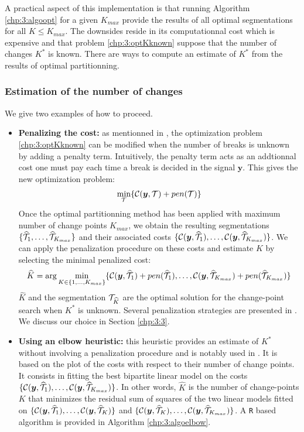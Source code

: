 A practical aspect of this implementation is that running Algorithm \ref{chp:3:algoopt} for a given $K_{max}$ provide the results of all optimal segmentations for all $K \leq K_{max}$. The downsides reside in its computationnal cost which is expensive and that problem \ref{chp:3:optKknown} suppose that the number of changes $K^*$ is known. There are ways to compute an estimate of $K^*$ from the results of optimal partitionning. 

\subsubsection{Estimation of the number of changes}

We give two examples of how to proceed.

\begin{itemize}
\item \textbf{Penalizing the cost:} as mentionned in \cite{truong2020}, the optimization problem \ref{chp:3:optKknown} can be modified when the number of breaks is unknown by adding a penalty term. Intuitively, the penalty term acts as an addtionnal cost one must pay each time a break is decided in the signal $\bm y$. This gives the new optimization problem: 
\begin{equation}\label{chp:3:optKnknown}
\min_{{\mathcal T}} \{ \mathcal{C}(\bm y,{\mathcal T}) + pen({\mathcal T}) \} 
\end{equation}   
Once the optimal partitionning method has been applied with maximum number of change points $K_{max}$, we obtain the resulting segmentations $\{\widehat{{\mathcal T}}_1,\dots,\widehat{{\mathcal T}}_{K_{max}}\}$ and their associated costs $\{{\mathcal C}(\bm y, \widehat{{\mathcal T}}_1),\dots,{\mathcal C}(\bm y, \widehat{{\mathcal T}}_{K_{max}})\}$. We can apply the penalization procedure on these costs and estimate $K$ by selecting the minimal penalized cost:
\begin{equation}\label{chp:3:Khat}
\widehat{K} = \arg\min_{K \in \{1,\dots,K_{max}\}} \{{\mathcal C}(\bm y, \widehat{{\mathcal T}}_1)+pen(\widehat{{\mathcal T}}_1),\dots,{\mathcal C}(\bm y, \widehat{{\mathcal T}}_{K_{max}})+pen(\widehat{{\mathcal T}}_{K_{max}})\} 
\end{equation}
$\widehat{K}$ and the segmentation ${\mathcal T}_{\widehat{K}}$ are the optimal solution for the change-point search when $K^*$ is unknown. Several penalization strategies are presented in \cite{truong2020}. We discuss our choice in Section \ref{chp:3:3}.  
\item \textbf{Using an elbow heuristic:} this heuristic provides an estimate of $K^*$ without involving a penalization procedure and is notably used in \cite{lung2015}. It is based on the plot of the costs with respect to their number of change points. It consists in fitting the best bipartite linear model on the costs $\{{\mathcal C}(\bm y, \widehat{{\mathcal T}}_1),\dots,{\mathcal C}(\bm y, \widehat{{\mathcal T}}_{K_{max}})\}$. In other words, $\widehat{K}$ is the number of change-points $K$ that minimizes the residual sum of squares of the two linear models fitted on $\{{\mathcal C}(\bm y, \widehat{{\mathcal T}}_1),\dots,{\mathcal C}(\bm y, \widehat{{\mathcal T}}_{K})\}$ and $\{{\mathcal C}(\bm y, \widehat{{\mathcal T}}_K),\dots,{\mathcal C}(\bm y, \widehat{{\mathcal T}}_{K_{max}})\}$. A \texttt{R} based algorithm is provided in Algorithm \ref{chp:3:algoelbow}.
\end{itemize}    

